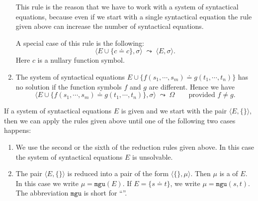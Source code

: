 \begin{enumerate}
      This rule is the reason that we have to work with a system of syntactical equations, because even if we
      start with a single syntactical equation the rule given above can increase the number of syntactical
      equations. 

      A special case of this rule is the following:  
      \[ \Big\langle E \cup \big\{ c \doteq c \big\}, \sigma \Big\rangle \;\leadsto\; 
         \Big\langle E, \sigma \Big\rangle.
      \]
      Here $c$ is a nullary function symbol.
\item The system of syntactical equations $E \cup \big\{ f(s_1,\cdots,s_m) \doteq g(t_1,\cdots,t_n) \big\}$ has
      no solution if the function symbols $f$ and $g$ are different.  Hence we have
      \[ \Big\langle E \cup \big\{ f(s_1,\cdots,s_m) \doteq g(t_1,\cdots,t_n) \big\},
      \sigma \Big\rangle \;\leadsto\; \Omega \qquad \mbox{provided $f \not= g$}. \]
\end{enumerate}
If a system of syntactical equations $E$ is given and we start with the pair 
$\langle E, \{\}\rangle$, then we can apply the rules given above until one of the following two cases happens: 
\begin{enumerate}
\item We use the second or the sixth of the reduction rules given above.
      In this case the system of syntactical equations $E$ is unsolvable.
\item The pair $\langle E, \{\} \rangle$ is reduced into a pair of the form $\langle \{\}, \mu\rangle$.
      Then $\mu$ is a   of $E$.  In this case we write $\mu = \mathtt{mgu}(E)$.
      If $E = \{ s \doteq t \}$, we write $\mu = \mathtt{mgu}(s, t)$.  The abbreviation
      $\mathtt{mgu}$ is short for {``''}.
\end{enumerate}

